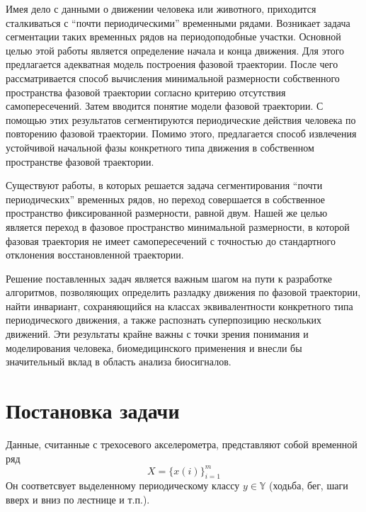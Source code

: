 \documentclass[12pt, twoside]{article}
\begin{document}
Имея дело с данными о движении человека или животного, приходится сталкиваться с “почти периодическими” временными рядами. Возникает задача сегментации таких временных рядов на периодоподобные участки. Основной целью этой работы является определение начала и конца движения. Для этого предлагается адекватная модель построения фазовой траектории. После чего рассматривается способ вычисления минимальной размерности собственного пространства фазовой траектории согласно критерию отсутствия самопересечений. Затем вводится понятие модели фазовой траектории. С помощью этих результатов сегментируются периодические действия человека по повторению фазовой траектории. Помимо этого, предлагается способ извлечения устойчивой начальной фазы конкретного типа движения в собственном пространстве фазовой траектории.

Существуют работы, в которых решается задача сегментирования “почти периодических” временных рядов, но переход совершается в собственное пространство фиксированной размерности, равной двум. Нашей же целью является переход в фазовое пространство минимальной размерности, в которой фазовая траектория не имеет самопересечений с точностью до стандартного отклонения восстановленной траектории.

Решение поставленных задач является важным шагом на пути к разработке алгоритмов, позволяющих определить разладку движения по фазовой траектории, найти инвариант, сохраняющийся на классах эквивалентности конкретного типа периодического движения, а также распознать суперпозицию нескольких движений. Эти результаты крайне важны с точки зрения понимания и моделирования человека, биомедицинского применения и внесли бы значительный вклад в область анализа биосигналов.

\section{Постановка задачи}
Данные, считанные с трехосевого акселерометра, представляют собой временной ряд 
    \begin{equation}\label{ts}
        X = \{ x(i) \}_{i = 1}^{m}
    \end{equation}  
Он соответсвует выделенному периодическому классу $y\in\mathbb{Y}$ (ходьба, бег, шаги вверх и вниз по лестнице и т.п.).
\end{document}
